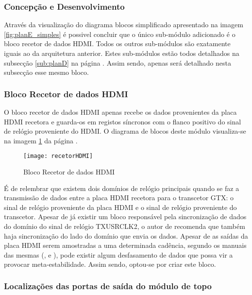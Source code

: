 \subsubsection{Concepção e Desenvolvimento}

Através da visualização do diagrama blocos simplificado apresentado na imagem \ref{fig:planE_simples} é possivel concluir que o único sub-módulo adicionado é o bloco recetor de dados HDMI. Todos os outros sub-módulos são exatamente iguais ao da arquitetura anterior. Estes sub-módulos estão todos detalhados na subsecção \ref{sub:planD} na página \pageref{sub:planD}. Assim sendo, apenas será detalhado nesta subsecção esse mesmo bloco.

\subsubsection*{Bloco Recetor de dados HDMI}
O bloco recetor de dados HDMI apenas recebe os dados provenientes da placa HDMI recetora e guarda-os em registos síncronos com o flanco positivo do sinal de relógio proveniente do HDMI. O diagrama de blocos deste módulo visualiza-se na imagem \ref{fig:recetorHDMI} da página \pageref{fig:recetorHDMI}.
\begin{figure}[h!]
	\begin{center}
		\leavevmode
		\texttt{[image: recetorHDMI]}
		\captionsetup{width=1.0\linewidth}
		\caption[Bloco recetor de dados HDMI]{Bloco Recetor de dados HDMI}
		\label{fig:recetorHDMI}
	\end{center}
\end{figure}

É de relembrar que existem dois domínios de relógio principais quando se faz a transmissão de dados entre a placa HDMI recetora para o transcetor GTX: o sinal de relógio proveniente da placa HDMI e o sinal de relógio proveniente do transcetor. Apesar de já existir um bloco responsável pela sincronização de dados do domínio do sinal de relógio TXUSRCLK2, o autor de \cite{R024} recomenda que também haja sincronização do lado do domínio que envia os dados. Apesar de as saídas da placa HDMI serem amostradas a uma determinada cadência, segundo os manuais das mesmas (\cite{R009}, \cite{R014} e \cite{R013}), pode existir algum desfasamento de dados que possa vir a provocar meta-estabilidade. Assim sendo, optou-se por criar este bloco.

\subsubsection*{Localizações das portas de saída do módulo de topo} \label{subsub:serial_locs_planE}

